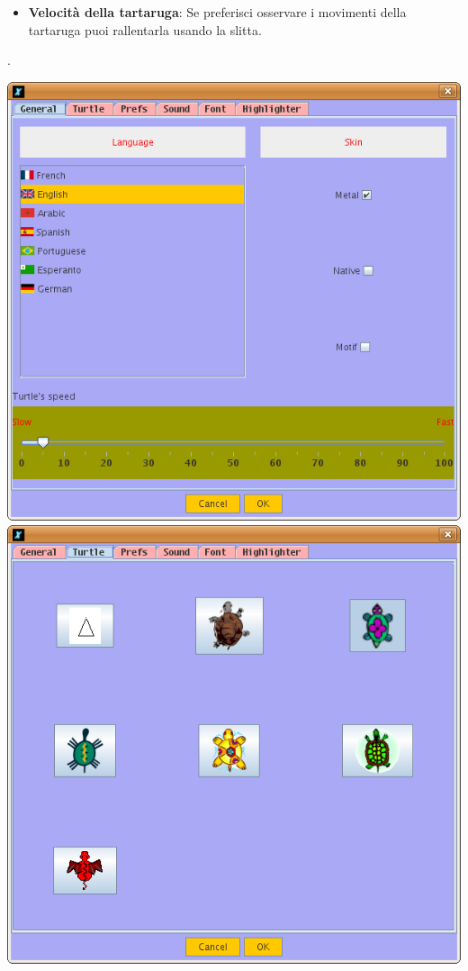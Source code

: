 \begin{itemize}
\begin{itemize}
\begin{itemize}
			\item \textbf{Velocità della tartaruga}: Se preferisci osservare i movimenti della tartaruga puoi rallentarla usando la slitta.
			\end{itemize}. 
			\begin{center}
				\includegraphics[scale=0.3]{pics/interface-CapturePref1.png}
				\includegraphics[scale=0.3]{pics/interface-CapturePref2.png}

\end{center}
\end{itemize}
\end{itemize}
